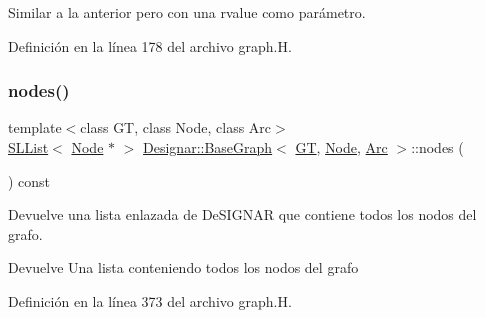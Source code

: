 Similar a la anterior pero con una rvalue como parámetro. 



Definición en la línea 178 del archivo graph.\+H.

\mbox{\label{class_designar_1_1_base_graph_a56b1ec4a0258d9f22542f33615bcdbea}} 
\subsubsection{\texorpdfstring{nodes()}{nodes()}}
{\footnotesize\ttfamily template$<$class GT, class Node, class Arc$>$ \\
\hyperlink{class_designar_1_1_s_l_list}{S\+L\+List}$<$ \hyperlink{namespace_designar_a5af326c65aa2bd26b26c410f2030d09e}{Node} $\ast$ $>$ \hyperlink{class_designar_1_1_base_graph}{Designar\+::\+Base\+Graph}$<$ \hyperlink{demo-buildgraph_8_c_a3001c40d2c31ca87ed96cd7d1334a55e}{GT}, \hyperlink{namespace_designar_a5af326c65aa2bd26b26c410f2030d09e}{Node}, \hyperlink{namespace_designar_a3f55fb5513d62ff47cbc8f72b8e95d6f}{Arc} $>$\+::nodes (\begin{DoxyParamCaption}{ }\end{DoxyParamCaption}) const\hspace{0.3cm}{\ttfamily [inline]}}



Devuelve una lista enlazada de De\+S\+I\+G\+N\+AR que contiene todos los nodos del grafo. 

\begin{DoxyReturn}{Devuelve}
Una lista conteniendo todos los nodos del grafo 
\end{DoxyReturn}


Definición en la línea 373 del archivo graph.\+H.

\mbox{\label{class_designar_1_1_base_graph_acf4b230e0d981f36770722011c96206f}} 
